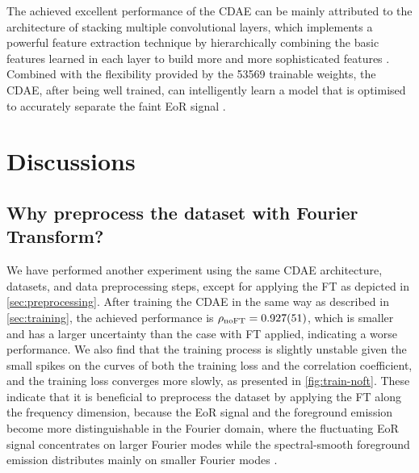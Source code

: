 \documentclass[fleqn,usenatbib]{mnras}
\newcommand{\R}[1]{\mathrm{#1}}
\begin{document}
The achieved excellent performance of the CDAE can be mainly attributed
to the architecture of stacking multiple convolutional layers, which
implements a powerful feature extraction technique by hierarchically
combining the basic features learned in each layer to build more and
more sophisticated features \citep{lecun2015}.
Combined with the flexibility provided by the \num{53569} trainable
weights, the CDAE, after being well trained, can intelligently learn a
model that is optimised to accurately separate the faint EoR signal
\citep[e.g.,][]{domingos2012}.


\section{Discussions}
\label{sec:discussions}

\subsection{Why preprocess the dataset with Fourier Transform?}
\label{sec:why-ft}

We have performed another experiment using the same CDAE architecture,
datasets, and data preprocessing steps, except for applying the FT
as depicted in \autoref{sec:preprocessing}.
After training the CDAE in the same way as described in
\autoref{sec:training}, the achieved performance is
$\rho_{\R{noFT}} = \num{0.927 +- 0.051}$, which is smaller and has a
larger uncertainty than the case with FT applied, indicating a worse
performance.
We also find that the training process is slightly unstable given the
small spikes on the curves of both the training loss and the correlation
coefficient, and the training loss converges more slowly,
as presented in \autoref{fig:train-noft}.
These indicate that it is beneficial to preprocess the
dataset by applying the FT along the frequency dimension, because the
EoR signal and the foreground emission become more distinguishable
in the Fourier domain, where the fluctuating EoR signal concentrates on
larger Fourier modes while the spectral-smooth foreground emission
distributes mainly on smaller Fourier modes \citep[e.g.,][]{parsons2012}.
\end{document}
